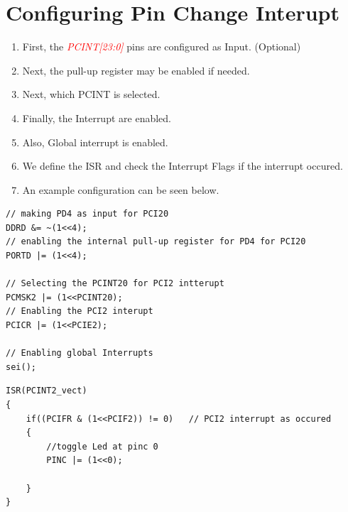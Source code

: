\documentclass{article}
\newcommand{\pinFormat}[1]{\emph{\textcolor{red}{#1}}}
\begin{document}
\section{Configuring Pin Change Interupt}
\begin{enumerate}[label=(\Roman*)]
    \item First, the \pinFormat{PCINT[23:0]} pins are configured as Input. (Optional)
    \item Next, the pull-up register may be enabled if needed.
    \item Next, which PCINT is selected.
    \item Finally, the Interrupt are enabled.
    \item Also, Global interrupt is enabled.
    \item We define the ISR and check the Interrupt Flags if the interrupt occured.
    \item An example configuration can be seen below.
\end{enumerate}

\begin{minipage}{0.5\textwidth}
\begin{verbatim}
// making PD4 as input for PCI20
DDRD &= ~(1<<4);
// enabling the internal pull-up register for PD4 for PCI20
PORTD |= (1<<4);

// Selecting the PCINT20 for PCI2 intterupt
PCMSK2 |= (1<<PCINT20);
// Enabling the PCI2 interupt
PCICR |= (1<<PCIE2);

// Enabling global Interrupts
sei();	
\end{verbatim}
\end{minipage}
\begin{minipage}{0.45\textwidth}
\begin{verbatim}
ISR(PCINT2_vect)
{
    if((PCIFR & (1<<PCIF2)) != 0)	// PCI2 interrupt as occured
    {		
        //toggle Led at pinc 0
        PINC |= (1<<0);

    }
}
\end{verbatim}
\end{minipage}
\end{document}
